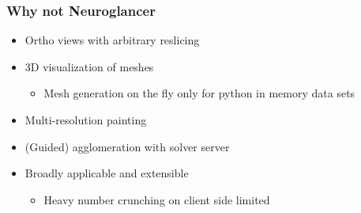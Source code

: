 \documentclass[aspectratio=169]{beamer}
\newcommand{\cmark}{\ding{51}}%
\newcommand{\xmark}{\ding{55}}%
\begin{document}
\begin{frame}
    \frametitle{Why not Neuroglancer}
    \begin{itemize}
          \item<1->[\color{green}\cmark] Ortho views with arbitrary reslicing
          \item<2->[\only<2>{\color{green}\cmark}\only<3->{\color{yellow}\cmark}] 3D visualization of meshes
        \begin{itemize}
              \item<3->[\color{red}\xmark] Mesh generation on the fly only for python in memory data sets
        \end{itemize}
          \item<4->[\color{red}\xmark] Multi-resolution painting
          \item<5->[\color{red}\xmark] (Guided) agglomeration with solver server
          \item<6->[\only<6>{\color{green}\cmark}\only<7->{\color{yellow}\cmark}] Broadly applicable and extensible
        \begin{itemize}
              \item<7->[\color{red}\xmark] Heavy number crunching on client side limited \\ 
        \end{itemize}
    \end{itemize}
\end{frame}

\end{document}
